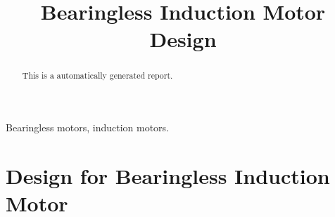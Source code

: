 \documentclass[]{interact}
\begin{document}
\title{Bearingless Induction Motor Design}
\author{
}
\maketitle
\begin{abstract}
  This is a automatically generated report.
\end{abstract}
\begin{keywords}
Bearingless motors, induction motors.
\end{keywords}

\section{Design for Bearingless Induction Motor}

\end{document}
